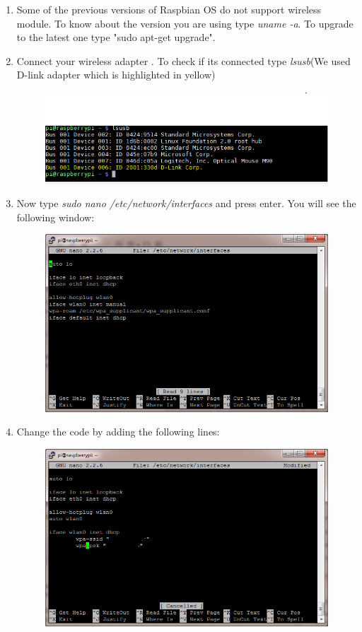 \documentclass[11pt,a4paper]{report}
\begin{document}
\begin{flushleft}
\begin{enumerate}
\begin{figure}[h!]
			\centering
			\caption{}
		\end{figure}
		\item Some of the previous versions of Raspbian OS do not support wireless module. To know about the version you are using type \textit{uname -a}. To upgrade to the latest one type "sudo apt-get upgrade".
		\item Connect your wireless adapter . To check if its connected type \textit{lsusb}(We used D-link adapter which is highlighted in yellow) 
		\begin{figure}[h!]
			\includegraphics[scale=0.6]{Lsusb.PNG}
			\centering
			\caption{}
		\end{figure}
		\item Now type \textit{sudo nano /etc/network/interfaces} and press enter. You will see the following window:
		\newpage
		\begin{figure}[h!]
			\includegraphics[scale=0.6]{iwifi.png}
			\centering
			\caption{}
		\end{figure}
		\item Change the code by adding the following lines:
		\begin{figure}[h!]
			\includegraphics[scale=0.6]{wificon.png}

\end{figure}
\end{enumerate}
\end{flushleft}
\end{document}
